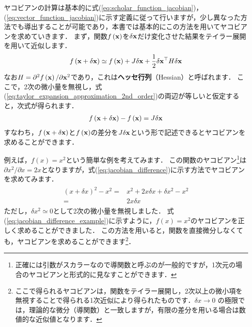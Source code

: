 ヤコビアンの計算は基本的に式(\ref{eq:scholar_function_jacobian})，(\ref{eq:vector_function_jacobian})に示す定義に従って行いますが，少し異なった方法でも導出することが可能であり，本書では基本的にこの方法を用いてヤコビアンを求めていきます．
まず，関数$f \left( {\bf x} \right)$を$\delta {\bf x}$だけ変化させた結果をテイラー展開を用いて近似します．
%
\begin{align}
  f \left( {\bf x} + \delta {\bf x} \right) \simeq
  f \left( {\bf x} \right) + 
  J \delta {\bf x} + 
  \frac{1}{2} \delta {\bf x}^{\top} H \delta {\bf x}
  \label{eq:taylor_expansion_approximation_2nd_order}
\end{align}
%
なお$H = \partial^{2} f \left( {\bf x} \right) / \partial {\bf x}^{2}$であり，これは{\bf ヘッセ行列}（Hessian）と呼ばれます．
ここで，2次の微小量を無視し，式(\ref{eq:taylor_expansion_approximation_2nd_order})の両辺が等しいと仮定すると，次式が得られます．
%
\begin{align}
  f \left( {\bf x} + \delta {\bf x} \right) - f \left( {\bf x} \right) = J \delta {\bf x}
  \label{eq:jacobian_difference}
\end{align}
%
すなわち，$f \left( {\bf x} + \delta {\bf x} \right)$と$f \left( {\bf x} \right)$の差分を$J \delta {\bf x}$という形で記述できるとヤコビアンを求めることができます．

例えば，$f \left( x \right) = x^{2}$という簡単な例を考えてみます．
この関数のヤコビアン\footnote{正確には引数がスカラーなので導関数と呼ぶのが一般的ですが，1次元の場合のヤコビアンと形式的に見なすことができます．}は$\partial x^{2} / \partial x = 2x$となりますが，式(\ref{eq:jacobian_difference})に示す方法でヤコビアンを求めてみます．
%
\begin{align}
  \begin{split}
    (x + \delta x)^{2} - x^{2}
    = & x^{2} + 2 x \delta x + \delta x^{2} - x^{2} \\
    = & 2 x \delta x
  \end{split}
  \label{eq:jacobian_difference_example}
\end{align}
%
ただし，$\delta x^{2} \simeq 0$として2次の微小量を無視しました．  
式(\ref{eq:jacobian_difference_example})に示すように，$f \left( x \right) = x^{2}$のヤコビアンを正しく求めることができました．
この方法を用いると，関数を直接微分しなくても，ヤコビアンを求めることができます\footnote{ここで得られるヤコビアンは，関数をテイラー展開し，2次以上の微小項を無視することで得られる1次近似により得られたものです．$\delta x \to 0$ の極限では，理論的な微分（導関数）と一致しますが，有限の差分を用いる場合は数値的な近似値となります．}．













